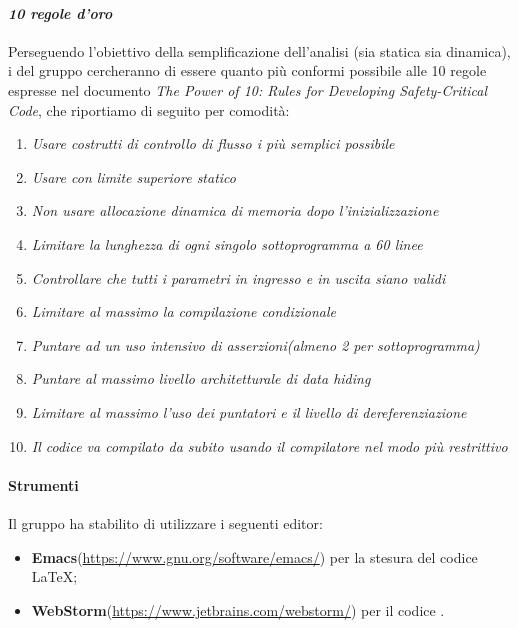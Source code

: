 		\paragraph*{\textit{10 regole d'oro}}
		Perseguendo l'obiettivo della semplificazione dell'analisi (sia statica sia dinamica),
           	i  del gruppo cercheranno di essere quanto più conformi possibile alle 10 regole
           	espresse nel documento \textit{The Power of 10: Rules for Developing Safety-Critical Code}, che riportiamo di seguito per comodità:
                	\begin{enumerate}
                        	\item \textit{Usare costrutti di controllo di flusso i più semplici possibile}
                        	\item \textit{Usare  con limite superiore statico}
                        	\item \textit{Non usare allocazione dinamica di memoria dopo l'inizializzazione}
                        	\item \textit{Limitare la lunghezza di ogni singolo sottoprogramma a 60 linee}
                        	\item \textit{Controllare che tutti i parametri in ingresso e in uscita siano validi}
                        	\item \textit{Limitare al massimo la compilazione condizionale}
                        	\item \textit{Puntare ad un uso intensivo di asserzioni(almeno 2 per sottoprogramma)}
                        	\item \textit{Puntare al massimo livello architetturale di \textit{data hiding}}
                        	\item \textit{Limitare al massimo l'uso dei puntatori e il livello di dereferenziazione}
                        	\item \textit{Il codice va compilato da subito usando il compilatore nel modo più restrittivo}
			\end{enumerate}

                \paragraph*{Strumenti}
                Il gruppo ha stabilito di utilizzare i seguenti editor:
                \begin{itemize}
                  \item \textbf{Emacs}(\url{https://www.gnu.org/software/emacs/}) per la stesura del codice \LaTeX; 
                  \item \textbf{WebStorm}(\url{https://www.jetbrains.com/webstorm/}) per il codice .
                \end{itemize}
